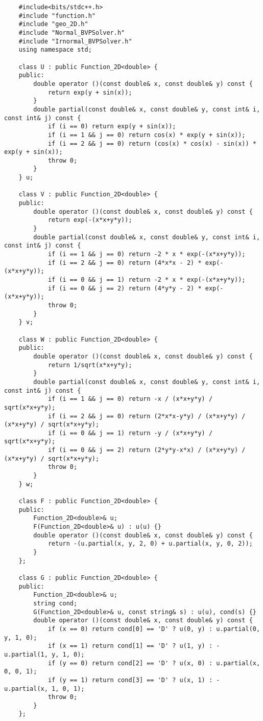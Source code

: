 \documentclass{ctexart}
\begin{document}
\begin{lstlisting}
    #include<bits/stdc++.h>
    #include "function.h"
    #include "geo_2D.h"
    #include "Normal_BVPSolver.h"
    #include "Irnormal_BVPSolver.h"
    using namespace std;
    
    class U : public Function_2D<double> {
    public:
        double operator ()(const double& x, const double& y) const {
            return exp(y + sin(x));
        }
        double partial(const double& x, const double& y, const int& i, const int& j) const {
            if (i == 0) return exp(y + sin(x));
            if (i == 1 && j == 0) return cos(x) * exp(y + sin(x));
            if (i == 2 && j == 0) return (cos(x) * cos(x) - sin(x)) * exp(y + sin(x));
            throw 0;
        }
    } u;
    
    class V : public Function_2D<double> {
    public:
        double operator ()(const double& x, const double& y) const {
            return exp(-(x*x+y*y));
        }
        double partial(const double& x, const double& y, const int& i, const int& j) const {
            if (i == 1 && j == 0) return -2 * x * exp(-(x*x+y*y));
            if (i == 2 && j == 0) return (4*x*x - 2) * exp(-(x*x+y*y));
            if (i == 0 && j == 1) return -2 * x * exp(-(x*x+y*y));
            if (i == 0 && j == 2) return (4*y*y - 2) * exp(-(x*x+y*y));
            throw 0;
        }
    } v;
    
    class W : public Function_2D<double> {
    public:
        double operator ()(const double& x, const double& y) const {
            return 1/sqrt(x*x+y*y);
        }
        double partial(const double& x, const double& y, const int& i, const int& j) const {
            if (i == 1 && j == 0) return -x / (x*x+y*y) / sqrt(x*x+y*y);
            if (i == 2 && j == 0) return (2*x*x-y*y) / (x*x+y*y) / (x*x+y*y) / sqrt(x*x+y*y);
            if (i == 0 && j == 1) return -y / (x*x+y*y) / sqrt(x*x+y*y);
            if (i == 0 && j == 2) return (2*y*y-x*x) / (x*x+y*y) / (x*x+y*y) / sqrt(x*x+y*y);
            throw 0;
        }
    } w;
    
    class F : public Function_2D<double> {
    public:
        Function_2D<double>& u;
        F(Function_2D<double>& u) : u(u) {}
        double operator ()(const double& x, const double& y) const {
            return -(u.partial(x, y, 2, 0) + u.partial(x, y, 0, 2));
        }
    };
    
    class G : public Function_2D<double> {
    public:
        Function_2D<double>& u;
        string cond;
        G(Function_2D<double>& u, const string& s) : u(u), cond(s) {}
        double operator ()(const double& x, const double& y) const {
            if (x == 0) return cond[0] == 'D' ? u(0, y) : u.partial(0, y, 1, 0);
            if (x == 1) return cond[1] == 'D' ? u(1, y) : -u.partial(1, y, 1, 0);
            if (y == 0) return cond[2] == 'D' ? u(x, 0) : u.partial(x, 0, 0, 1);
            if (y == 1) return cond[3] == 'D' ? u(x, 1) : -u.partial(x, 1, 0, 1);
            throw 0;
        }
    };
    

\end{lstlisting}
\end{document}

